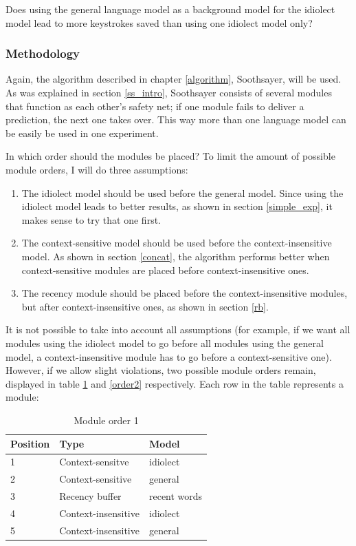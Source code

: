 \documentclass[12pt]{article}
\begin{document}
\begin{examples}

\item Does using the general language model as a background model for the idiolect model lead to more keystrokes saved than using one idiolect model only?

\end{examples}

\subsubsection{Methodology}
Again, the algorithm described in chapter \ref{algorithm}, Soothsayer, will be used. As was explained in section \ref{ss_intro}, Soothsayer consists of several modules that function as each other's safety net; if one module fails to deliver a prediction, the next one takes over. This way more than one language model can be easily be used in one experiment.

In which order should the modules be placed? To limit the amount of possible module orders, I will do three assumptions:

\begin{enumerate}

\item The idiolect model should be used before the general model. Since using the idiolect model leads to better results, as shown in section \ref{simple_exp}, it makes sense to try that one first.
\item The context-sensitive model should be used before the context-insensitive model. As shown in section \ref{concat}, the algorithm performs better when context-sensitive modules are placed before context-insensitive ones.
\item The recency module should be placed before the context-insensitive modules, but after context-insensitive ones, as shown in section \ref{rb}.

\end{enumerate}

It is not possible to take into account all assumptions (for example, if we want all modules using the idiolect model to go before all modules using the general model, a context-insensitive module has to go before a context-sensitive one). However, if we allow slight violations, two possible module orders remain, displayed in table \ref{order1} and \ref{order2} respectively. Each row in the table represents a module:

\begin{table}[h]
\begin{tabular}{lll} 
Position&Type&Model\\
\hline
1&Context-sensitve&idiolect\\
2&Context-sensitive&general\\
3&Recency buffer&recent words\\
4&Context-insensitive&idiolect\\
5&Context-insensitive&general\\
\end{tabular} 
\caption{Module order 1} \label{order1}
\end{table}
\end{document}
